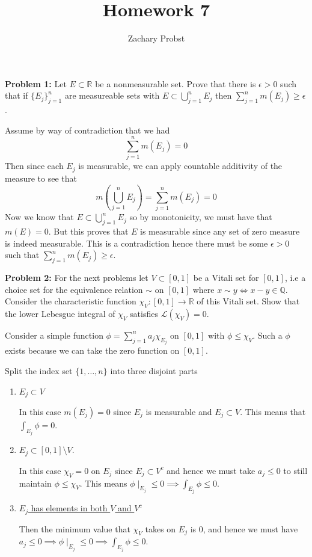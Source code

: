 \documentclass[11pt]{article}
\title{Homework 7}
\author{Zachary Probst}
\newcommand{\R}{\mathbb{R}}
\newcommand{\Q}{\mathbb{Q}}
\begin{document}
    \maketitle

    \begin{mybox}
        \textbf{Problem 1:} Let $E \subset \R$ be a nonmeasurable set.
        Prove that there is $\epsilon > 0$ such that if $\{ E_j \}_{j=1}^{n}$ are measureable sets with $E \subset \bigcup_{j=1}^{n} E_j$ then $\sum_{j=1}^{n} m(E_j) \geq \epsilon$.
    \end{mybox}

    Assume by way of contradiction that we had
    \[
        \sum_{j=1}^{n} m(E_j) = 0
    \]
    Then since each $E_j$ is measurable, we can apply countable additivity of the measure to see that
    \[
        m\left( \bigcup_{j=1}^{n} E_j \right) =  \sum_{j=1}^{n} m(E_j) = 0
    \]
    Now we know that $E \subset \bigcup_{j=1}^{n} E_j$ so by monotonicity, we must have that $m(E) = 0$.
    But this proves that $E$ is measurable since any set of zero measure is indeed measurable.
    This is a contradiction hence there must be some $\epsilon > 0$ such that $\sum_{j=1}^{n} m(E_j) \geq \epsilon$.

    \clearpage

    \begin{mybox}
        \textbf{Problem 2:} For the next problems let $V \subset [0,1]$ be a Vitali set for $[0,1]$, i.e a choice set for the equivalence relation $\sim$ on $[0,1]$ where $x \sim y \iff x - y \in \Q$.
        Consider the characteristic function $\chi_V: [0,1] \rightarrow \R$ of this Vitali set.
        Show that the lower Lebesgue integral of $\chi_V$ satisfies $\mathcal{L} (\chi_V) = 0 $.
    \end{mybox}

    Consider a simple function $\phi = \sum_{j=1}^{n} a_j \chi_{E_j}$ on $[0,1]$ with $\phi \leq \chi_{V}$.
    Such a $\phi$ exists because we can take the zero function on $[0,1]$.

    Split the index set $\{ 1, \hdots, n \}$ into three disjoint parts
    \begin{enumerate}
        \item \underline{$E_j \subset V$}

        In this case $m(E_j) = 0$ since $E_j$ is measurable and $E_j \subset V$.
        This means that $\int_{E_j} \phi = 0$.
        \item \underline{$E_j \subset [0,1] \setminus V$}.

        In this case $\chi_V = 0$ on $E_j$ since $E_j \subset V^c$ and hence we must take $a_j \leq 0$ to still maintain $\phi \leq \chi_V$.
        This means $\phi \mid_{E_j} \leq 0 \implies \int_{E_j} \phi \leq 0$.
        \item \underline{$E_j$ has elements in both $V$ and $V^c$}

        Then the minimum value that $\chi_V$ takes on $E_j$ is 0, and hence we must have $a_j \leq 0 \implies \phi \mid_{E_j} \leq 0 \implies \int_{E_j} \phi \leq 0$.
    \end{enumerate}
\end{document}
